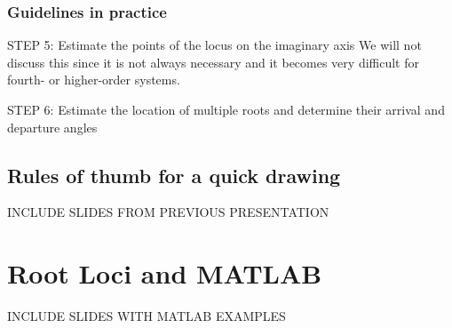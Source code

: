 \begin{frame}
\frametitle{Guidelines in practice}	
	\begin{block}{STEP 5: Estimate the points of the locus on the imaginary axis}
		We will not discuss this since it is not always necessary and it becomes very difficult for fourth- or higher-order systems.
	\end{block}
	
	\begin{block}{STEP 6: Estimate the location of multiple roots and determine their arrival and departure angles}
		
	\end{block}
\end{frame}

\subsection{Rules of thumb for a quick drawing}

\begin{frame}
	INCLUDE SLIDES FROM PREVIOUS PRESENTATION
\end{frame}

\section{Root Loci and MATLAB}

\begin{frame}
	INCLUDE SLIDES WITH MATLAB EXAMPLES
\end{frame}